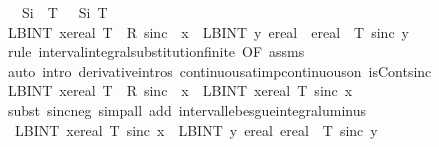 \documentclass{article}
\theoremstyle{definition}
\begin{document}
\begin{isabellebody}
\ \ \ {\isachardoublequoteopen}Si\ {\isacharparenleft}{\isacharminus}\ T{\isacharparenright}\ {\isacharequal}\ {\isacharminus}\ Si\ T{\isachardoublequoteclose}\isanewline
{}\isamarkupfalse%
\ {\isacharminus}\isanewline
\ \ \isamarkupfalse%
\ {\isachardoublequoteopen}LBINT\ x{\isacharequal}ereal\ {}{\isachardot}{\isachardot}T{\isachardot}\ {\isacharminus}{}\ {\isacharasterisk}\isactrlsub R\ sinc\ {\isacharparenleft}{\isacharminus}\ x{\isacharparenright}\ {\isacharequal}\ LBINT\ y{\isacharequal}\ ereal\ {\isacharparenleft}{\isacharminus}\ {}{\isacharparenright}{\isachardot}{\isachardot}ereal\ {\isacharparenleft}{\isacharminus}\ T{\isacharparenright}{\isachardot}\ sinc\ y{\isachardoublequoteclose}\isanewline
\ \ \ \ \isamarkupfalse%
\ {\isacharparenleft}rule\ interval{\isacharunderscore}integral{\isacharunderscore}substitution{\isacharunderscore}finite\ {\isacharbrackleft}OF\ assms{\isacharbrackright}{\isacharparenright}\isanewline
\ \ \ \ \isamarkupfalse%
\ {\isacharparenleft}auto\ intro{\isacharcolon}\ derivative{\isacharunderscore}intros\ continuous{\isacharunderscore}at{\isacharunderscore}imp{\isacharunderscore}continuous{\isacharunderscore}on\ isCont{\isacharunderscore}sinc{\isacharparenright}\isanewline
\ \ \isamarkupfalse%
\ \isamarkupfalse%
\ {\isachardoublequoteopen}{\isacharparenleft}LBINT\ x{\isacharequal}ereal\ {}{\isachardot}{\isachardot}T{\isachardot}\ {\isacharminus}{}\ {\isacharasterisk}\isactrlsub R\ sinc\ {\isacharparenleft}{\isacharminus}\ x{\isacharparenright}{\isacharparenright}\ {\isacharequal}\ {\isacharminus}{\isacharparenleft}LBINT\ x{\isacharequal}ereal\ {}{\isachardot}{\isachardot}T{\isachardot}\ sinc\ x{\isacharparenright}{\isachardoublequoteclose}\isanewline
\ \ \ \ \isamarkupfalse%
\ {\isacharparenleft}subst\ sinc{\isacharunderscore}neg{\isacharparenright}\ {\isacharparenleft}simp{\isacharunderscore}all\ add{\isacharcolon}\ interval{\isacharunderscore}lebesgue{\isacharunderscore}integral{\isacharunderscore}uminus{\isacharparenright}\isanewline
\ \ \isamarkupfalse%
\ \isamarkupfalse%
\ {\isacharasterisk}{\isacharcolon}\ {\isachardoublequoteopen}{\isacharminus}{\isacharparenleft}LBINT\ x{\isacharequal}ereal\ {}{\isachardot}{\isachardot}T{\isachardot}\ sinc\ x{\isacharparenright}\ {\isacharequal}\ LBINT\ y{\isacharequal}\ ereal\ {}{\isachardot}{\isachardot}ereal\ {\isacharparenleft}{\isacharminus}\ T{\isacharparenright}{\isachardot}\ sinc\ y{\isachardoublequoteclose}\isanewline

\end{isabellebody}
\end{document}
